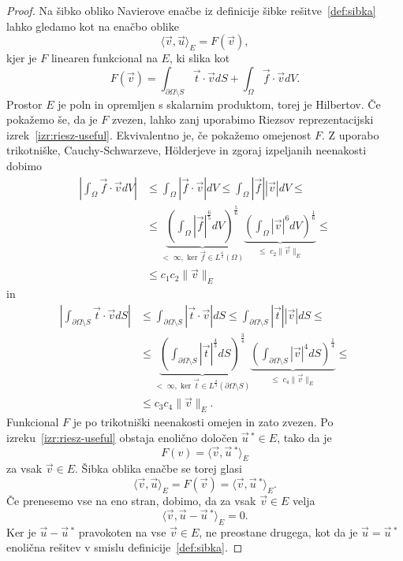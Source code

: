 \documentclass[12pt,a4paper,twoside]{article}
\theoremstyle{definition} %
\theoremstyle{plain} %
\numberwithin{equation}{section}
\newcommand{\vv}{\vec{v}}
\newcommand{\vt}{\vec{t}}
\newcommand{\vu}{\vec{u}}
\newcommand{\vf}{\vec{f}}
\begin{document}
\begin{proof}
Na šibko obliko Navierove enačbe iz definicije šibke rešitve~\ref{def:sibka}
lahko gledamo kot na enačbo oblike
\begin{equation*}
  \langle \vv, \vu \rangle_E = F(\vv),
\end{equation*}
kjer je $F$ linearen funkcional na $E$, ki slika kot
\begin{equation*}
  F(\vv) = \int_{\partial \Omega\setminus S} \vt\cdot \vv dS + \int_{\Omega} \vf\cdot \vv dV.
\end{equation*}
Prostor $E$ je poln in opremljen s skalarnim produktom, torej je Hilbertov.  Če pokažemo še, da je
$F$ zvezen, lahko zanj uporabimo Riezsov reprezentacijski izrek~\ref{izr:riesz-useful}. Ekvivalentno
je, če pokažemo omejenost $F$. Z uporabo trikotniške, Cauchy-Schwarzeve, H\"olderjeve in zgoraj
izpeljanih neenakosti dobimo
\begin{align*}
  \left| \int_\Omega \vf \cdot \vv dV \right| &\leq
  \int_\Omega \left|\vf \cdot \vv \right| dV \leq
  \int_\Omega |\vf| |\vv| dV \leq \\
  &\leq \underbrace{\left(\int_\Omega |\vf|^\frac65 dV \right)^\frac56}_{<\;\infty,
  \text{ ker }\vf \in L^\frac65(\Omega)} \underbrace{\left( \int_\Omega
    |\vv|^6dV\right)^\frac16}_{\leq \; c_2 \|\vv\|_E} \leq \\
    &\leq c_1 c_2 \|\vv\|_E
\end{align*}
in
\begin{align*}
  \left| \int_{\partial \Omega \setminus S} \vt \cdot \vv dS \right| &\leq
  \int_{\partial \Omega \setminus S} \left|\vt \cdot \vv \right| dS \leq
  \int_{\partial \Omega \setminus S} |\vt| |\vv| dS \leq \\
  &\leq \underbrace{\left(\int_{\partial \Omega \setminus S} |\vt|^\frac43 dS
  \right)^\frac34}_{<\;\infty,
    \text{ ker }\vt \in L^\frac43({\partial \Omega \setminus S})} \underbrace{\left( \int_{\partial \Omega \setminus S}
    |\vv|^4dS\right)^\frac14}_{\leq \; c_4 \|\vv\|_E} \leq \\
    &\leq c_3 c_4 \|\vv\|_E.
\end{align*}
Funkcional $F$ je po trikotniški neenakosti omejen in zato zvezen. Po
izreku~\ref{izr:riesz-useful} obstaja enolično določen $\vu\,^\ast \in E$,
tako da je
\begin{equation*}
   F(v) = \langle \vv, \vu\,^\ast \rangle_E
\end{equation*}
za vsak $\vv \in E$. Šibka oblika enačbe se torej glasi
\begin{equation*}
   \langle \vv, \vu \rangle_E = F(\vv) = \langle \vv, \vu\,^\ast \rangle_E.
\end{equation*}
Če prenesemo vse na eno stran, dobimo, da za vsak $\vv \in E$ velja
\begin{equation*}
   \langle \vv, \vu - \vu\,^\ast \rangle_E = 0.
\end{equation*}
Ker je $\vu-\vu\,^\ast$ pravokoten na vse $\vv \in E$, ne preostane drugega,
kot da je $\vu = \vu\,^\ast$ enolična rešitev v smislu definicije~\ref{def:sibka}.
\end{proof}
\end{document}
